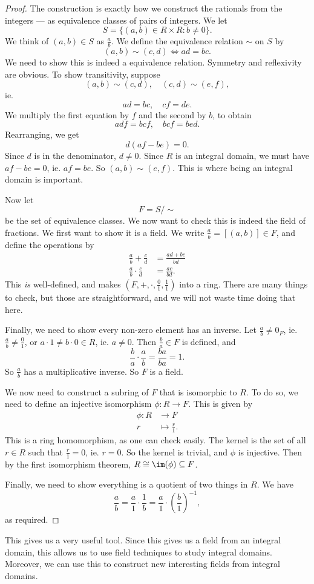 \documentclass[a4paper]{article}
\begin{document}
\begin{proof}
  The construction is exactly how we construct the rationals from the integers --- as equivalence classes of pairs of integers. We let
  \[
    S = \{(a, b) \in R \times R: b \not= 0\}.
  \]
  We think of $(a, b) \in S$ as $\frac{a}{b}$. We define the equivalence relation $\sim$ on $S$ by
  \[
    (a, b) \sim (c, d) \Leftrightarrow ad = bc.
  \]
  We need to show this is indeed a equivalence relation. Symmetry and reflexivity are obvious. To show transitivity, suppose
  \[
    (a, b) \sim (c, d),\quad (c, d) \sim (e, f),
  \]
  ie.
  \[
    ad = bc,\quad cf = de.
  \]
  We multiply the first equation by $f$ and the second by $b$, to obtain
  \[
    adf = bcf,\quad bcf = bed.
  \]
  Rearranging, we get
  \[
    d(af - be) = 0.
  \]
  Since $d$ is in the denominator, $d \not= 0$. Since $R$ is an integral domain, we must have $af - be = 0$, ie. $af = be$. So $(a, b) \sim (e, f)$. This is where being an integral domain is important.

  Now let
  \[
    F = S/{\sim}
  \]
  be the set of equivalence classes. We now want to check this is indeed the field of fractions. We first want to show it is a field. We write $\frac{a}{b} = [(a, b)] \in F$, and define the operations by
  \begin{align*}
    \frac{a}{b} + \frac{c}{d} &= \frac{ad + bc}{bd}\\
    \frac{a}{b}\cdot \frac{c}{d} &= \frac{ac}{bd}.
  \end{align*}
  This \emph{is} well-defined, and makes $(F, +, \cdot, \frac{0}{1}, \frac{1}{1})$ into a ring. There are many things to check, but those are straightforward, and we will not waste time doing that here.

  Finally, we need to show every non-zero element has an inverse. Let $\frac{a}{b} \not= 0_F$, ie. $\frac{a}{b} \not= \frac{0}{1}$, or $a\cdot 1 \not= b \cdot 0 \in R$, ie. $a \not= 0$. Then $\frac{b}{a} \in F$ is defined, and
  \[
    \frac{b}{a} \cdot \frac{a}{b} = \frac{ba}{ba} = 1.
  \]
  So $\frac{a}{b}$ has a multiplicative inverse. So $F$ is a field.

  We now need to construct a subring of $F$ that is isomorphic to $R$. To do so, we need to define an injective isomorphism $\phi: R \to F$. This is given by
  \begin{align*}
    \phi: R &\to F\\
    r &\mapsto \frac{r}{1}.
  \end{align*}
  This is a ring homomorphism, as one can check easily. The kernel is the set of all $r \in R$ such that $\frac{r}{1} = 0$, ie. $r = 0$. So the kernel is trivial, and $\phi$ is injective. Then by the first isomorphism theorem, $R \cong \im(\phi) \subseteq F$.

  Finally, we need to show everything is a quotient of two things in $R$. We have
  \[
    \frac{a}{b} = \frac{a}{1} \cdot \frac{1}{b} = \frac{a}{1}\cdot \left(\frac{b}{1}\right)^{-1},
  \]
  as required.
\end{proof}
This gives us a very useful tool. Since this gives us a field from an integral domain, this allows us to use field techniques to study integral domains. Moreover, we can use this to construct new interesting fields from integral domains.
\end{document}
